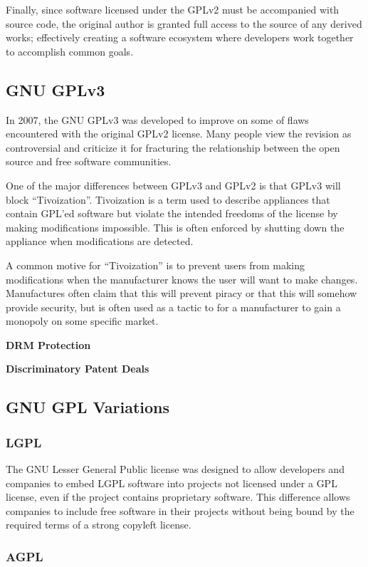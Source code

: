 \documentclass[12pt,letterpaper]{article}
\begin{document}
Finally, since software licensed under the GPLv2 must be accompanied with source code, the original author is granted full access to the source of any derived works; effectively creating a software ecosystem where developers work together to accomplish common goals.

\subsection{GNU GPLv3}

In 2007, the GNU GPLv3 was developed to improve on some of flaws encountered with the original GPLv2 license. Many people view the revision as controversial and criticize it for fracturing the relationship between the open source and free software communities.

One of the major differences between GPLv3 and GPLv2 is that GPLv3 will block ``Tivoization''. Tivoization is a term used to describe appliances that contain GPL'ed software but violate the intended freedoms of the license by making modifications impossible. This is often enforced by shutting down the appliance when modifications are detected.

A common motive for ``Tivoization'' is to prevent users from making modifications when the manufacturer knows the user will want to make changes. Manufactures often claim that this will prevent piracy or that this will somehow provide security, but is often used as a tactic to for a manufacturer to gain a monopoly on some specific market.

\textbf{DRM Protection}

\textbf{Discriminatory Patent Deals}

\subsection{GNU GPL Variations}

\subsubsection{LGPL}

The GNU Lesser General Public license was designed to allow developers and companies to embed LGPL software into projects not licensed under a GPL license, even if the project contains proprietary software. This difference allows companies to include free software in their projects without being bound by the required terms of a strong copyleft license.

\subsubsection{AGPL}
\end{document}
